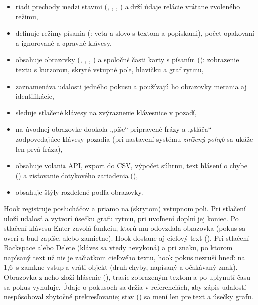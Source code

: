 \begin{itemize}
  \item {} riadi prechody medzi stavmi (,
        , , ) a drží
        údaje relácie vrátane zvoleného režimu,
  \item {} definuje režimy písania (: veta
        a slovo s textom a popiskami), počet opakovaní a ignorované
        a opravné klávesy,
  \item {} obsahuje obrazovky (, ,
        , ) a spoločné časti karty
        s písaním (): zobrazenie textu s kurzorom, skryté vstupné pole, hlavičku
        a graf rytmu,
  \item {} zaznamenáva udalosti jedného
        pokusu a používajú ho obrazovky merania aj identifikácie,
  \item {} sleduje stlačené klávesy na
        zvýraznenie klávesnice v pozadí,
  \item {} na úvodnej obrazovke dookola „píše“
        pripravené frázy a „stláča“ zodpovedajúce klávesy pozadia (pri
        nastavení systému \emph{znížený pohyb} sa ukáže len prvá fráza),
  \item {} obsahuje volania API, export do CSV, výpočet súhrnu,
        text hlásení o chybe () a zisťovanie dotykového
        zariadenia (),
  \item {} obsahuje štýly rozdelené podľa obrazovky.
\end{itemize}

Hook  registruje poslucháčov  a
 priamo na (skrytom) vstupnom poli. Pri stlačení uloží udalosť
a vytvorí úsečku grafu rytmu, pri uvoľnení doplní jej koniec. Po stlačení
klávesu Enter zavolá funkciu, ktorú mu odovzdala obrazovka (pokus
sa overí a buď zapíše, alebo zamietne). Hook dostane aj cieľový text
(). Pri stlačení Backspace alebo Delete (kláves sa vtedy
nevykoná) a pri znaku, po ktorom napísaný text už nie je začiatkom cieľového
textu, hook pokus nezruší hneď: na 1,6~s zamkne vstup a vráti objekt
 (druh chyby, napísaný a očakávaný znak). Obrazovka z neho
zloží hlásenie (), trasie zobrazeným textom a po
uplynutí času sa pokus vynuluje. Údaje o pokusoch sa
držia v referenciách, aby zápis udalostí nespôsoboval zbytočné
prekresľovanie; stav () sa mení len pre text a úsečky grafu.

